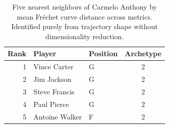 \begin{table}[htbp]
  \centering\small
  \begin{tabular}{rllc}
    \toprule
    Rank & Player & Position & Archetype \\
    \midrule
    1 & Vince Carter & G & 2 \\
    2 & Jim Jackson & G & 2 \\
    3 & Steve Francis & G & 2 \\
    4 & Paul Pierce & G & 2 \\
    5 & Antoine Walker & F & 2 \\
    \bottomrule
  \end{tabular}
  \caption{Five nearest neighbors of Carmelo Anthony by mean Fr\'{e}chet curve distance across metrics. Identified purely from trajectory shape without dimensionality reduction.}
  \label{tab:Carmelo_Anthony_frechet_curve_neighbors}
\end{table}

